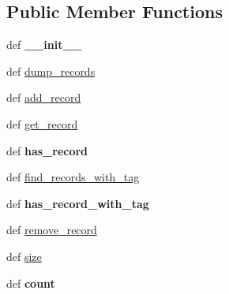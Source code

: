\subsection*{Public Member Functions}
\begin{DoxyCompactItemize}
\item 
\hypertarget{classetl_1_1recshelf_1_1MemoryRecordSet_1_1MemoryRecordSet_ad19e823f909c56fcda06829b2aa4208a}{def {\bfseries \-\_\-\-\_\-init\-\_\-\-\_\-}}\label{classetl_1_1recshelf_1_1MemoryRecordSet_1_1MemoryRecordSet_ad19e823f909c56fcda06829b2aa4208a}

\item 
def \hyperlink{classetl_1_1recshelf_1_1MemoryRecordSet_1_1MemoryRecordSet_afd7320b379c5c7e045f2616252337fc6}{dump\-\_\-records}
\item 
def \hyperlink{classetl_1_1recshelf_1_1MemoryRecordSet_1_1MemoryRecordSet_a00d61494917b21379a954d9ce997ca31}{add\-\_\-record}
\item 
def \hyperlink{classetl_1_1recshelf_1_1MemoryRecordSet_1_1MemoryRecordSet_a6c655eb1e6cfb73a9516c165fbb5c682}{get\-\_\-record}
\item 
\hypertarget{classetl_1_1recshelf_1_1MemoryRecordSet_1_1MemoryRecordSet_aa138fc96e0100b2e800bfa415c2b9d3e}{def {\bfseries has\-\_\-record}}\label{classetl_1_1recshelf_1_1MemoryRecordSet_1_1MemoryRecordSet_aa138fc96e0100b2e800bfa415c2b9d3e}

\item 
def \hyperlink{classetl_1_1recshelf_1_1MemoryRecordSet_1_1MemoryRecordSet_aad7c550515b18387e7b2c3df06447ea2}{find\-\_\-records\-\_\-with\-\_\-tag}
\item 
\hypertarget{classetl_1_1recshelf_1_1MemoryRecordSet_1_1MemoryRecordSet_a8d7c09c79fc751c7a84c40ba73f91888}{def {\bfseries has\-\_\-record\-\_\-with\-\_\-tag}}\label{classetl_1_1recshelf_1_1MemoryRecordSet_1_1MemoryRecordSet_a8d7c09c79fc751c7a84c40ba73f91888}

\item 
def \hyperlink{classetl_1_1recshelf_1_1MemoryRecordSet_1_1MemoryRecordSet_a6b8f6fa6dba066f9f1ee9bb52dcf7568}{remove\-\_\-record}
\item 
def \hyperlink{classetl_1_1recshelf_1_1MemoryRecordSet_1_1MemoryRecordSet_a9bb4a7678b7a8f7bcd7d46ea9ab789aa}{size}
\item 
\hypertarget{classetl_1_1recshelf_1_1MemoryRecordSet_1_1MemoryRecordSet_a7d8f79931efa62a7ea2598668506acce}{def {\bfseries count}}\label{classetl_1_1recshelf_1_1MemoryRecordSet_1_1MemoryRecordSet_a7d8f79931efa62a7ea2598668506acce}

\end{DoxyCompactItemize}


